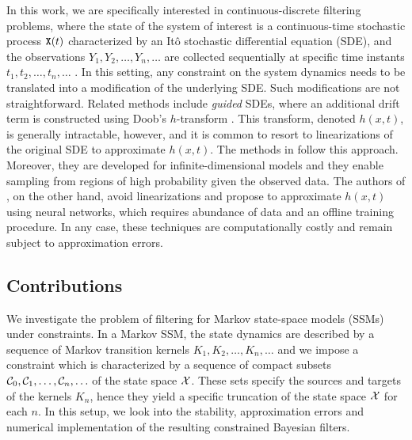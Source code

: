 \documentclass[onefignum,onetabnum]{siamonline250211}%
\begin{document}
In this work, we are specifically interested in continuous-discrete filtering problems, where the state of the system of interest is a continuous-time stochastic process $\mathtt{X}(t)$ characterized by an It\^o stochastic differential equation (SDE), and the observations $Y_1, Y_2, \ldots, Y_n, \ldots$  are collected sequentially at specific time instants $t_1, t_2, \ldots, t_n, \ldots $ \cite{Akyildiz24}. In this setting, any constraint on the system dynamics needs to be translated into a modification of the underlying SDE. Such modifications are not straightforward. Related methods include {\em guided} SDEs, where an additional drift term is constructed using Doob's $h$-transform \cite{Chopin23,Pieper-Sethmacher25,Pieper-Sethmacher25b,Pieper-Sethmacher25c,Eklund25}. This transform, denoted $h(x,t)$, is generally intractable, however, and it is common to resort to linearizations of the original SDE to approximate $h(x,t)$. The methods in \cite{Pieper-Sethmacher25,Pieper-Sethmacher25b,Pieper-Sethmacher25c,Eklund25} follow this approach. Moreover, they are developed for infinite-dimensional models and they enable sampling from regions of high probability given the observed data. The authors of \cite{Chopin23}, on the other hand, avoid linearizations and propose to approximate $h(x,t)$ using neural networks, which requires abundance of data and an offline training procedure. In any case, these techniques are computationally costly and remain subject to approximation errors.

%
\subsection{Contributions}

We investigate the problem of filtering for Markov state-space models (SSMs) \cite{Sarkka13} under constraints. In a Markov SSM, the state dynamics are described by a sequence of Markov transition kernels $K_1, K_2, \ldots, K_n, \ldots$ and we impose a constraint which is characterized by a sequence of compact subsets ${\mathcal C}_0, {\mathcal C}_1, \ldots, {\mathcal C}_n, \ldots$ of the state space ${\mathcal X}$. These sets specify the sources and targets of the kernels $K_n$, hence they yield a specific truncation of the state space ${\mathcal X}$ for each $n$. In this setup, we look into the stability, approximation errors and numerical implementation of the resulting constrained Bayesian filters. 
\end{document}
